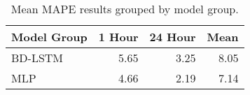 \begin{table}[H]
\centering
\begin{tabular}{lrrr}
\toprule
Model Group & 1 Hour & 24 Hour & Mean \\
\midrule
BD-LSTM & 5.65 & 3.25 & 8.05 \\
MLP & 4.66 & 2.19 & 7.14 \\
\bottomrule
\end{tabular}
\caption{Mean MAPE results grouped by model group.}
\label{model-group-MAPE}
\end{table}
